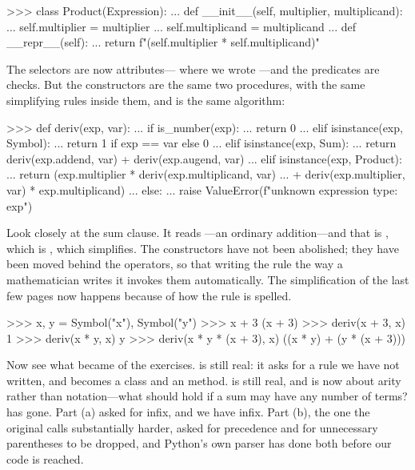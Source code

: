 \begin{revealTheSurface}
\begin{codeBlock}
>>> class Product(Expression):
...     def __init__(self, multiplier, multiplicand):
...         self.multiplier = multiplier
...         self.multiplicand = multiplicand
...     def __repr__(self):
...         return f"({self.multiplier} * {self.multiplicand})"
\end{codeBlock}

\noindent
The selectors are now attributes--- where we wrote
---and the predicates are  checks.  But the
constructors are the same two procedures, with the same simplifying rules
inside them, and  is the same algorithm:

\begin{codeBlock}
>>> def deriv(exp, var):
...     if is_number(exp):
...         return 0
...     elif isinstance(exp, Symbol):
...         return 1 if exp == var else 0
...     elif isinstance(exp, Sum):
...         return deriv(exp.addend, var) + deriv(exp.augend, var)
...     elif isinstance(exp, Product):
...         return (exp.multiplier * deriv(exp.multiplicand, var)
...                 + deriv(exp.multiplier, var) * exp.multiplicand)
...     else:
...         raise ValueError(f"unknown expression type: {exp}")
\end{codeBlock}

\noindent
Look closely at the sum clause.  It reads ---an
ordinary addition---and that \code{+} is , which is
, which simplifies.  The constructors have not been abolished;
they have been moved behind the operators, so that writing the rule the way a
mathematician writes it invokes them automatically.  The simplification of the
last few pages now happens because of how the rule is spelled.

\begin{codeBlock}
>>> x, y = Symbol("x"), Symbol("y")
>>> x + 3
(x + 3)
>>> deriv(x + 3, x)
1
>>> deriv(x * y, x)
y
>>> deriv(x * y * (x + 3), x)
((x * y) + (y * (x + 3)))
\end{codeBlock}

\noindent
Now see what became of the exercises.   is still real: it
asks for a rule we have not written, and becomes a  class and an
 method.   is still real, and is now about
arity rather than notation---what should  hold if a sum may have any
number of terms?   has gone.  Part (a) asked for infix, and
we have infix.  Part (b), the one the original calls substantially harder,
asked for precedence and for unnecessary parentheses to be dropped, and Python's
own parser has done both before our code is reached.


\end{revealTheSurface}
